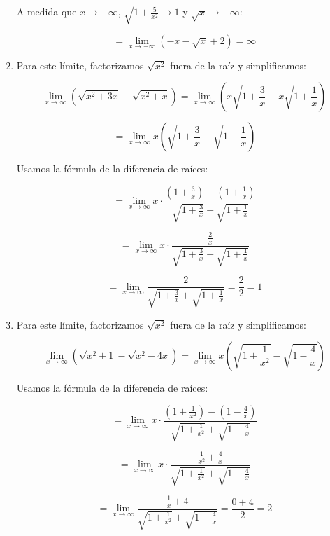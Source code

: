 \documentclass[answers]{exam} %
\begin{document}
\begin{questions}
\begin{solution}
\begin{enumerate}[label=\alph*.]
			A medida que \(x \to -\infty\), \(\sqrt{1+\frac{5}{x^2}} \to 1\) y \(\sqrt{x} \to -\infty\):
	
			\[
			= \lim_{x\to{-\infty}} (-x - \sqrt{x} + 2) = \infty
			\]
	
			\item Para este límite, factorizamos \(\sqrt{x^2}\) fuera de la raíz y simplificamos:
	
			\[
			\lim_{x\to{\infty}} (\sqrt{x^2+3x}-\sqrt{x^2+x}) = \lim_{x\to{\infty}} (x\sqrt{1+\frac{3}{x}}-x\sqrt{1+\frac{1}{x}})
			\]
	
			\[
			= \lim_{x\to{\infty}} x (\sqrt{1+\frac{3}{x}} - \sqrt{1+\frac{1}{x}})
			\]
	
			Usamos la fórmula de la diferencia de raíces:
	
			\[
			= \lim_{x\to{\infty}} x \cdot \frac{(1+\frac{3}{x}) - (1+\frac{1}{x})}{\sqrt{1+\frac{3}{x}} + \sqrt{1+\frac{1}{x}}}
			\]
	
			\[
			= \lim_{x\to{\infty}} x \cdot \frac{\frac{2}{x}}{\sqrt{1+\frac{3}{x}} + \sqrt{1+\frac{1}{x}}}
			\]
	
			\[
			= \lim_{x\to{\infty}} \frac{2}{\sqrt{1+\frac{3}{x}} + \sqrt{1+\frac{1}{x}}} = \frac{2}{2} = 1
			\]
	
			\item Para este límite, factorizamos \(\sqrt{x^2}\) fuera de la raíz y simplificamos:
	
			\[
			\lim_{x\to{\infty}} (\sqrt{x^2+1}-\sqrt{x^2-4x}) = \lim_{x\to{\infty}} x(\sqrt{1+\frac{1}{x^2}}-\sqrt{1-\frac{4}{x}})
			\]
	
			Usamos la fórmula de la diferencia de raíces:
	
			\[
			= \lim_{x\to{\infty}} x \cdot \frac{(1+\frac{1}{x^2}) - (1-\frac{4}{x})}{\sqrt{1+\frac{1}{x^2}} + \sqrt{1-\frac{4}{x}}}
			\]
	
			\[
			= \lim_{x\to{\infty}} x \cdot \frac{\frac{1}{x^2} + \frac{4}{x}}{\sqrt{1+\frac{1}{x^2}} + \sqrt{1-\frac{4}{x}}}
			\]
	
			\[
			= \lim_{x\to{\infty}} \frac{\frac{1}{x} + 4}{\sqrt{1+\frac{1}{x^2}} + \sqrt{1-\frac{4}{x}}} = \frac{0+4}{2} = 2
			\]
	
		\end{enumerate}
	\end{solution}
	

	\vspace{0.5cm}


\end{questions}
\end{document}
